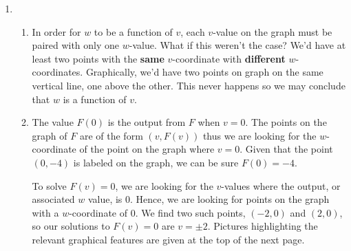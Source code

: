 \documentclass{ximera}
\begin{document}
\begin{example}
 \begin{enumerate}

\item  \begin{enumerate}

\item In order for $w$ to be a function of $v$, each $v$-value on the graph must be paired with  only one $w$-value.  What if this weren't the case?  We'd have at least two points with the \textbf{same} $v$-coordinate with \textbf{different} $w$-coordinates.  Graphically, we'd have two points on graph on the same vertical line, one above the other.  This never happens so we may conclude that $w$ is a function of $v$.

\item The value $F(0)$ is the output from $F$ when  $v = 0$.  The points on the graph of $F$ are of the form $(v, F(v))$ thus we are looking for the $w$-coordinate of the point on the graph where $v = 0$.  Given that the point $(0,-4)$  is labeled on the graph, we can be sure $F(0) = -4$.  

\smallskip

To solve $F(v) = 0$, we are looking for the $v$-values where the output, or associated $w$ value, is $0$.  Hence, we are looking for points on the graph with a $w$-coordinate of $0$.  We find two such points, $(-2,0)$ and $(2,0)$, so our solutions to $F(v) = 0$ are $v = \pm 2$.  Pictures highlighting the relevant graphical features are given at the top of the next page.

% 




\end{enumerate}
\end{enumerate}
\end{example}
\end{document}
